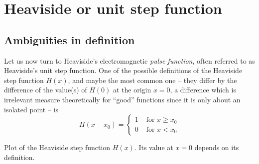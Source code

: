 
\section{Heaviside or unit step function}

\subsection{Ambiguities in definition}
Let us now turn
to Heaviside's electromagnetic {\em pulse function}, often referred to as Heaviside's unit step function.
One of the possible definitions of the Heaviside step function $H(x)$, and maybe the most common one --
they differ by the difference of the value(s) of $H(0)$ at the origin $x=0$, a difference which is irrelevant measure theoretically for ``good'' functions
since it is only about an isolated point --
is
\begin{equation}
H(x-x_0)
=
\left\{
\begin{array}{rl}
1&\textrm{ for } x\ge x_0\\
0&\textrm{ for } x < x_0
\end{array}
\right.
\label{2011-m-di-edhf}
\end{equation}
\begin{marginfigure}
\begin{center}
\end{center}
\caption{Plot of the Heaviside step function  $H(x)$.
Its value at $x=0$ depends on its definition.}
\label{2011-m-fhsf}
\end{marginfigure}
